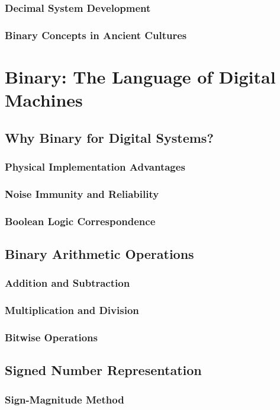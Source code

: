 \documentclass[12pt, oneside, openany]{book}
\begin{document}
\subsubsection{Decimal System Development}
\subsubsection{Binary Concepts in Ancient Cultures}

\section{Binary: The Language of Digital Machines}
\subsection{Why Binary for Digital Systems?}
\subsubsection{Physical Implementation Advantages}
\subsubsection{Noise Immunity and Reliability}
\subsubsection{Boolean Logic Correspondence}

\subsection{Binary Arithmetic Operations}
\subsubsection{Addition and Subtraction}
\subsubsection{Multiplication and Division}
\subsubsection{Bitwise Operations}

\subsection{Signed Number Representation}
\subsubsection{Sign-Magnitude Method}
\end{document}

